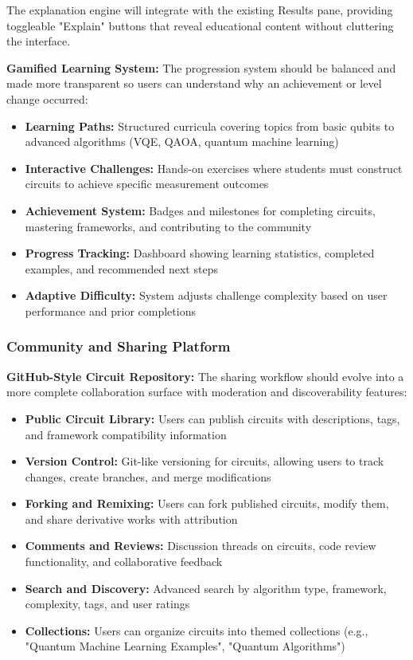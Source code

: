 The explanation engine will integrate with the existing Results pane, providing toggleable "Explain" buttons that reveal educational content without cluttering the interface.

\textbf{Gamified Learning System:} The progression system should be balanced and made more transparent so users can understand why an achievement or level change occurred:
\begin{itemize}
    \item \textbf{Learning Paths:} Structured curricula covering topics from basic qubits to advanced algorithms (VQE, QAOA, quantum machine learning)
    \item \textbf{Interactive Challenges:} Hands-on exercises where students must construct circuits to achieve specific measurement outcomes
    \item \textbf{Achievement System:} Badges and milestones for completing circuits, mastering frameworks, and contributing to the community
    \item \textbf{Progress Tracking:} Dashboard showing learning statistics, completed examples, and recommended next steps
    \item \textbf{Adaptive Difficulty:} System adjusts challenge complexity based on user performance and prior completions
\end{itemize}

\subsubsection{Community and Sharing Platform}

\textbf{GitHub-Style Circuit Repository:} The sharing workflow should evolve into a more complete collaboration surface with moderation and discoverability features:
\begin{itemize}
    \item \textbf{Public Circuit Library:} Users can publish circuits with descriptions, tags, and framework compatibility information
    \item \textbf{Version Control:} Git-like versioning for circuits, allowing users to track changes, create branches, and merge modifications
    \item \textbf{Forking and Remixing:} Users can fork published circuits, modify them, and share derivative works with attribution
    \item \textbf{Comments and Reviews:} Discussion threads on circuits, code review functionality, and collaborative feedback
    \item \textbf{Search and Discovery:} Advanced search by algorithm type, framework, complexity, tags, and user ratings
    \item \textbf{Collections:} Users can organize circuits into themed collections (e.g., "Quantum Machine Learning Examples", "Quantum Algorithms")
\end{itemize}

